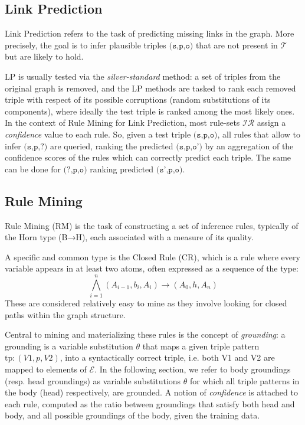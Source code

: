 \documentclass[a4paper,UKenglish,cleveref, autoref, thm-restate]{tgdk-v2021}
\begin{document}
\subsection{Link Prediction}
Link Prediction refers to the task of predicting missing links in the graph. More precisely, the goal is to infer plausible triples $\texttt{(s,p,o)}$ that are not present in $\mathcal{T}$ but are likely to hold.

LP is usually tested via the \textit{silver-standard} method: a set of triples from the original graph is removed, and the LP methods are tasked to rank each removed triple with respect of its possible corruptions (random substitutions of its components), where ideally the test triple is ranked among the most likely ones. 
In the context of Rule Mining for Link Prediction, most rule-sets $\mathcal{IR}$ assign a \textit{confidence} value to each rule. So, given a test triple $\texttt{(s,p,o)}$, all rules that allow to infer $\texttt{(s,p,?)}$ are queried, ranking the predicted $\texttt{(s,p,o')}$ by an aggregation of the confidence scores of the rules which can correctly predict each triple. The same can be done for $\texttt{(?,p,o)}$ ranking predicted $\texttt{(s',p,o)}$.

\subsection{Rule Mining}

Rule Mining (RM) is the task of constructing a set of inference rules, typically of the Horn type (B→H), each associated with a measure of its quality.

A specific and common type is the Closed Rule (CR), which is a rule where every variable appears in at least two atoms, often expressed as a sequence of the type: $$\bigwedge_{i=1}^{n} (A_{i-1}, b_i, A_i) \rightarrow (A_0, h , A_n)$$ 
These are considered relatively easy to mine as they involve looking for closed paths within the graph structure.

Central to mining and materializing these rules is the concept of \textit{grounding}: a grounding is a variable substitution $\theta$ that maps a given triple pattern $\text{tp}: (V1, p, V2)$, into a syntactically correct triple, i.e. both V1 and V2 are mapped to elements of $\mathcal{E}$.
In the following section, we refer to body groundings (resp. head groundings) as variable substitutions $\theta$ for which all triple patterns in the body (head) respectively, are grounded. A notion of \textit{confidence} is attached to each rule, computed as the ratio between groundings that satisfy both head and body, and all possible groundings of the body, given the training data.
    
\end{document}
